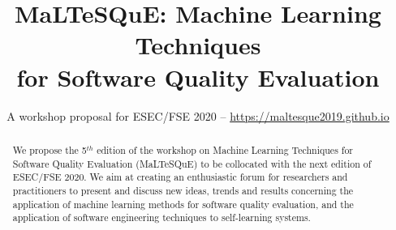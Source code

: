 \documentclass[sigconf]{acmart}
\begin{document}
\title{MaLTeSQuE: Machine Learning Techniques\\for Software Quality Evaluation}
\subtitle{A workshop proposal for ESEC/FSE 2020 -- \url{https://maltesque2019.github.io}}



\begin{abstract}
We propose the 5$^{th}$ edition of the workshop on Machine Learning Techniques for Software Quality Evaluation (MaLTeSQuE) to be collocated with the next edition of ESEC/FSE 2020.
We aim at creating an enthusiastic forum for researchers and practitioners to present and discuss new ideas, trends and results concerning the application of machine learning methods for software quality evaluation, and the application of software engineering techniques to self-learning systems.
\end{abstract}


\maketitle








\balance

	
\end{document}
